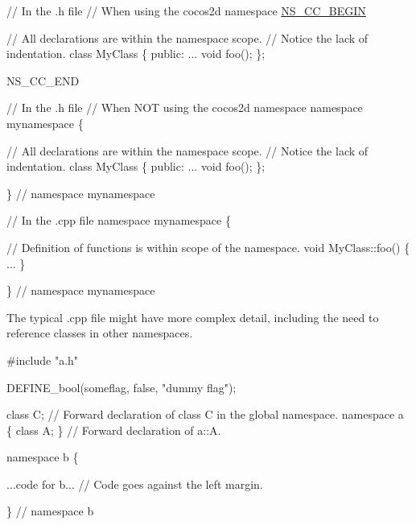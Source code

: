 \begin{DoxyCode}
\textcolor{comment}{// In the .h file}
\textcolor{comment}{// When using the cocos2d namespace}
\hyperlink{namespaceNS__CC__BEGIN}{NS\_CC\_BEGIN}

\textcolor{comment}{// All declarations are within the namespace scope.}
\textcolor{comment}{// Notice the lack of indentation.}
\textcolor{keyword}{class }MyClass
\{
\textcolor{keyword}{public}:
    ...
    \textcolor{keywordtype}{void} foo();
\};

NS\_CC\_END
\end{DoxyCode}



\begin{DoxyCode}
\textcolor{comment}{// In the .h file}
\textcolor{comment}{// When NOT using the cocos2d namespace}
\textcolor{keyword}{namespace }mynamespace \{

\textcolor{comment}{// All declarations are within the namespace scope.}
\textcolor{comment}{// Notice the lack of indentation.}
\textcolor{keyword}{class }MyClass
\{
\textcolor{keyword}{public}:
    ...
    \textcolor{keywordtype}{void} foo();
\};

\}  \textcolor{comment}{// namespace mynamespace}
\end{DoxyCode}



\begin{DoxyCode}
\textcolor{comment}{// In the .cpp file}
\textcolor{keyword}{namespace }mynamespace \{

\textcolor{comment}{// Definition of functions is within scope of the namespace.}
\textcolor{keywordtype}{void} MyClass::foo()
\{
    ...
\}

\}  \textcolor{comment}{// namespace mynamespace}
\end{DoxyCode}


The typical .cpp file might have more complex detail, including the need to reference classes in other namespaces.


\begin{DoxyCode}
\textcolor{preprocessor}{#include "a.h"}

DEFINE\_bool(someflag, \textcolor{keyword}{false}, \textcolor{stringliteral}{"dummy flag"});

\textcolor{keyword}{class }C;  \textcolor{comment}{// Forward declaration of class C in the global namespace.}
\textcolor{keyword}{namespace }a \{ \textcolor{keyword}{class }A; \}  \textcolor{comment}{// Forward declaration of a::A.}

\textcolor{keyword}{namespace }b \{

...code \textcolor{keywordflow}{for} b...         \textcolor{comment}{// Code goes against the left margin.}

\}  \textcolor{comment}{// namespace b}
\end{DoxyCode}



